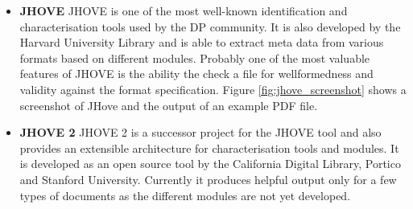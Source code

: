 \begin{itemize}
\item \textbf{JHOVE}\newline
JHOVE is one of the most well-known identification and characterisation tools used by the DP community. It is also developed by the Harvard University Library and is able to extract meta data from various formats based on different modules. Probably one of the most valuable features of JHOVE is the ability the check a file for wellformedness and validity against the format specification. Figure \ref{fig:jhove_screenshot} shows a screenshot of JHove and the output of an example PDF file.

\item \textbf{JHOVE 2}\newline
JHOVE 2 is a successor project for the JHOVE tool and also provides an extensible architecture for characterisation tools and modules. It is developed as an open source tool by the California Digital Library, Portico and Stanford University. Currently it produces helpful output only for a few types of documents as the different modules are not yet developed.
\end{itemize}

